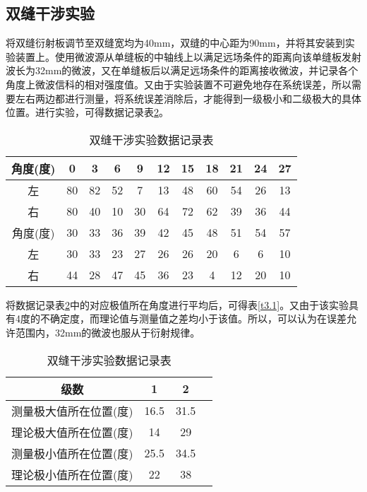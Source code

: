 \documentclass{article}
\begin{document}
\begin{CJK}{UTF8}{gkai}
\subsection{双缝干涉实验}
将双缝衍射板调节至双缝宽均为40mm，双缝的中心距为90mm，并将其安装到实验装置上。使用微波源从单缝板的中轴线上以满足远场条件的距离向该单缝板发射波长为32mm的微波，又在单缝板后以满足远场条件的距离接收微波，并记录各个角度上微波信科的相对强度值。又由于实验装置不可避免地存在系统误差，所以需要左右两边都进行测量，将系统误差消除后，才能得到一级极小和二级极大的具体位置。进行实验，可得数据记录表\ref{t3.0}。
\begin{table}[!htbp]
  \centering
  \caption{双缝干涉实验数据记录表}
  \label{t3.0}
  \begin{tabular}{|c|c|c|c|c|c|c|c|c|c|c|}
    \hline
    角度(度)&0&3&6&9&12&15&18&21&24&27\\
    \hline
    左&80&82&52&7&13&48&60&54&26&13\\
    \hline
    右&80&40&10&30&64&72&62&39&36&44\\
    \hline
    角度(度)&30&33&36&39&42&45&48&51&54&57\\
    \hline
    左&30&33&23&27&26&26&20&6&6&10\\
    \hline
    右&44&28&47&45&36&23&4&12&20&10\\
    \hline
  \end{tabular}
\end{table}

将数据记录表\ref{t3.0}中的对应极值所在角度进行平均后，可得表\ref{t3.1}。又由于该实验具有4度的不确定度，而理论值与测量值之差均小于该值。所以，可以认为在误差允许范围内，32mm的微波也服从于衍射规律。

\begin{table}[!htbp]
  \centering
  \caption{双缝干涉实验数据记录表}
  \label{t3.0}
  \begin{tabular}{|c|c|c|c|}
    \hline
    级数&1&2\\
    \hline
    测量极大值所在位置(度)&16.5&31.5\\
    \hline
    理论极大值所在位置(度)&14&29\\
    \hline
    测量极小值所在位置(度)&25.5&34.5\\
    \hline
    理论极小值所在位置(度)&22&38\\
    \hline
  \end{tabular}
\end{table}



\end{CJK}
\end{document}
